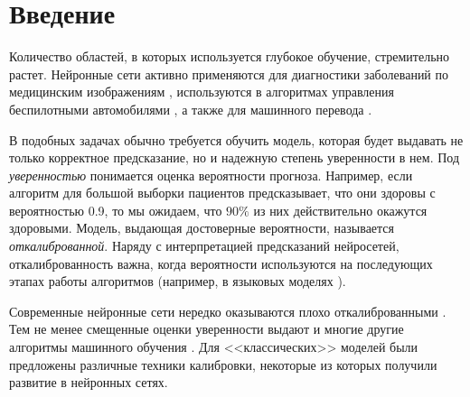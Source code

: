 \documentclass[12pt]{article}
\begin{document}
\newpage
\tableofcontents

\newpage

\section{Введение}

Количество областей, в которых используется глубокое обучение, стремительно растет. Нейронные сети активно применяются для диагностики заболеваний по медицинским изображениям \cite{medical_nn}, используются в алгоритмах управления беспилотными автомобилями \cite{self_driving}, а также для машинного перевода \cite{nmt_google}. 

В подобных задачах обычно требуется обучить модель, которая будет выдавать не только корректное предсказание, но и надежную степень уверенности в нем. Под \emph{уверенностью} понимается оценка вероятности прогноза. Например, если алгоритм для большой выборки пациентов предсказывает, что они здоровы с вероятностью 0.9, то мы ожидаем, что $90\%$ из них действительно окажутся здоровыми. Модель, выдающая достоверные вероятности, называется \emph{откалиброванной}. Наряду с интерпретацией предсказаний нейросетей, откалиброванность важна, когда вероятности используются на последующих этапах работы алгоритмов (например, в языковых моделях \cite{nn_lm}).

Современные нейронные сети нередко оказываются плохо откалиброванными \cite{on_cal}. Тем не менее смещенные оценки уверенности выдают и многие другие алгоритмы машинного обучения \cite{good_proba, emp_comparison}. Для <<классических>> моделей были предложены различные техники калибровки, некоторые из которых получили развитие в нейронных сетях.
\end{document}
